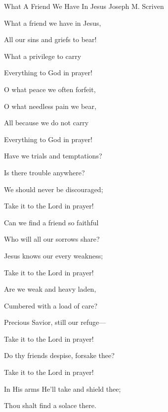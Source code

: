 \documentclass[12pt]{book}
\begin{document}
\begin{song}{What A Friend We Have In Jesus}{}
  {\SBPubDom}
  {Joseph M. Scriven}
  {}
  {}

  \begin{SBVerse}
    What a friend we have in Jesus,

    All our sins and griefs to bear!

    What a privilege to carry

    Everything to God in prayer!

    O what peace we often forfeit,

    O what needless pain we bear,

    All because we do not carry

    Everything to God in prayer!
  \end{SBVerse}

  \begin{SBVerse}
    Have we trials and temptations?

    Is there trouble anywhere?

    We should never be discouraged;

    Take it to the Lord in prayer!

    Can we find a friend so faithful

    Who will all our sorrows share?

    Jesus knows our every weakness;

    Take it to the Lord in prayer!
  \end{SBVerse}

  \begin{SBVerse}
    Are we weak and heavy laden,

    Cumbered with a load of care?

    Precious Savior, still our refuge---

    Take it to the Lord in prayer!

    Do thy friends despise, forsake thee?

    Take it to the Lord in prayer!

    In His arms He'll take and shield thee;

    Thou shalt find a solace there.
  \end{SBVerse}
\end{song}
\end{document}
